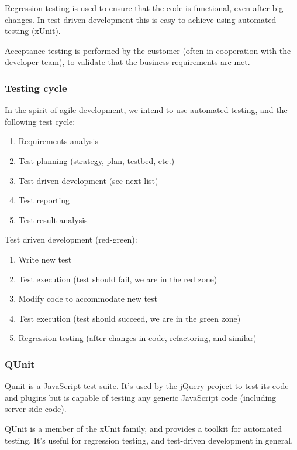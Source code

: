 Regression testing is used to ensure that the code is functional, even after
big changes. In test-driven development this is easy to achieve using automated
testing (xUnit).

Acceptance testing is performed by the customer (often in cooperation with the
developer team), to validate that the business requirements are met.

\subsubsection{Testing cycle}

In the spirit of agile development, we intend to use automated testing, and the
following test cycle:

\begin{enumerate}
	\item Requirements analysis
	\item Test planning (strategy, plan, testbed, etc.)
	\item Test-driven development (see next list)
	\item Test reporting
	\item Test result analysis
\end{enumerate}

Test driven development (red-green):
\begin{enumerate}
	\item Write new test
	\item Test execution (test should fail, we are in the red zone)
	\item Modify code to accommodate new test
	\item Test execution (test should succeed, we are in the green zone)
	\item Regression testing (after changes in code, refactoring, and similar)
\end{enumerate}

\subsubsection{QUnit}
\label{sec:pre-study_testing_qunit}
	Qunit is a JavaScript test suite. It's used by the jQuery project to test
	its code and plugins but is capable of testing any generic JavaScript code
	(including server-side code). \cite{jquery:qunit}

	QUnit is a member of the xUnit family, and provides a toolkit for automated
	testing. It's useful for regression testing, and test-driven development in
	general.

